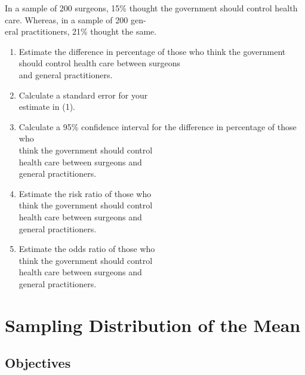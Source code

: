 \documentclass[11pt, chapterprefix=true]{scrbook}\usepackage[]{graphicx}\usepackage[]{color}
\begin{document}
\begin{exercises}
\begin{exercise}
In a sample of 200 surgeons, 15\% thought the government should control health care.  Whereas, in a sample of 200 gen- \\ eral practitioners, 21\% thought the same.

\begin{enumerate}
\item Estimate the difference in percentage of those who think the government should control health care between surgeons \\ and general practitioners.
\item Calculate a standard error for your \\ estimate in (1).
\item Calculate a 95\% confidence interval for the difference in percentage of those who \\ think the government should control \\ health care between surgeons and \\ general practitioners.
\item Estimate the risk ratio of those who \\ think the government should control \\ health care between surgeons and \\ general practitioners.
\item Estimate the odds ratio of those who \\ think the government should control \\ health care between surgeons and \\ general practitioners.
\end{enumerate}
  \end{exercise}


\end{exercises}
\onecolumn



\chapter{Sampling Distribution of the Mean}
\label{chap:ch10}

\section{Objectives}
\end{document}
